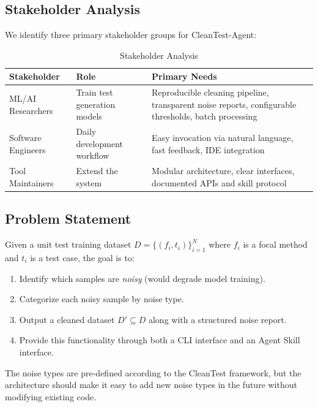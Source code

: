 \documentclass[acmlarge,nonacm,screen]{acmart}
\begin{document}
\subsection{Stakeholder Analysis}

We identify three primary stakeholder groups for CleanTest-Agent:

\begin{table}[htbp]
\caption{Stakeholder Analysis}
\label{tab:stakeholders}
\begin{tabular}{@{}lp{3cm}p{5.5cm}@{}}
\toprule
\textbf{Stakeholder} & \textbf{Role} & \textbf{Primary Needs} \\
\midrule
ML/AI Researchers & Train test generation models & Reproducible cleaning pipeline, transparent noise reports, configurable thresholds, batch processing \\
Software Engineers & Daily development workflow & Easy invocation via natural language, fast feedback, IDE integration \\
Tool Maintainers & Extend the system & Modular architecture, clear interfaces, documented APIs and skill protocol \\
\bottomrule
\end{tabular}
\end{table}

\subsection{Problem Statement}

Given a unit test training dataset $D = \{(f_i, t_i)\}_{i=1}^{N}$ where $f_i$ is a focal method and $t_i$ is a test case, the goal is to:

\begin{enumerate}
    \item Identify which samples are \textit{noisy} (would degrade model training).
    \item Categorize each noisy sample by noise type.
    \item Output a cleaned dataset $D' \subseteq D$ along with a structured noise report.
    \item Provide this functionality through both a CLI interface and an Agent Skill interface.
\end{enumerate}

The noise types are pre-defined according to the CleanTest framework, but the architecture should make it easy to add new noise types in the future without modifying existing code.
\end{document}
